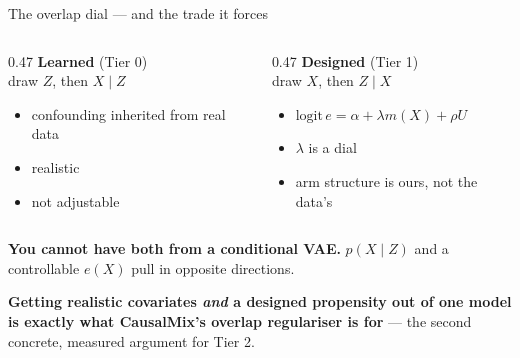 \documentclass[aspectratio=169]{beamer}
\begin{document}
\begin{frame}{The overlap dial --- and the trade it forces}
  \small
  \begin{columns}[T,totalwidth=\textwidth]
    \begin{column}{0.47\textwidth}
      \textbf{Learned} (Tier 0)\\
      draw $Z$, then $X \mid Z$
      \begin{itemize}
        \item confounding inherited from real data
        \item realistic
        \item \textcolor{navorange}{not adjustable}
      \end{itemize}
    \end{column}
    \begin{column}{0.47\textwidth}
      \textbf{Designed} (Tier 1)\\
      draw $X$, then $Z \mid X$
      \begin{itemize}
        \item $\text{logit}\,e = \alpha + \lambda m(X) + \rho U$
        \item \textcolor{resultgreen}{$\lambda$ is a dial}
        \item arm structure is ours, not the data's
      \end{itemize}
    \end{column}
  \end{columns}

  \vspace{0.6em}
  \textbf{You cannot have both from a conditional VAE.} $p(X \mid Z)$ and a
  controllable $e(X)$ pull in opposite directions.

  \vspace{0.4em}
  \textcolor{accent}{\textbf{Getting realistic covariates \emph{and} a designed
  propensity out of one model is exactly what CausalMix's overlap regulariser is
  for}} --- the second concrete, measured argument for Tier 2.
\end{frame}
\end{document}
